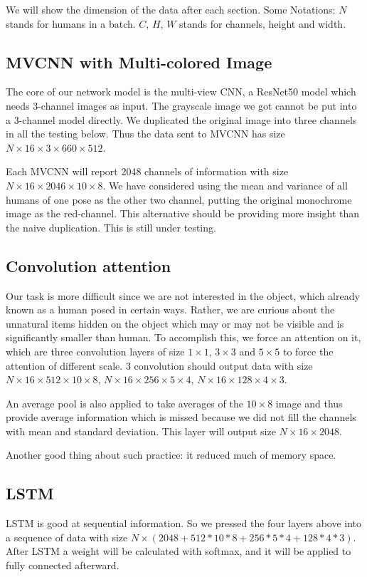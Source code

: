 \documentclass[conference,compsoc]{IEEEtran}
\begin{document}
We will show the dimension of the data after each section. Some Notations: $N$ stands for humans in a batch. $C$, $H$, $W$ stands for channels, height and width.

\subsection{MVCNN with Multi-colored Image}
The core of our network model is the multi-view CNN, a ResNet50 model which needs 3-channel images as input.
The grayscale image we got cannot be put into a 3-channel model directly. We duplicated the original image into three channels in all the testing below.
Thus the data sent to MVCNN has size $N\times16\times 3\times 660 \times 512$.

Each MVCNN will report 2048 channels of information with size $N \times 16 \times 2046 \times 10 \times 8$.
We have considered using the mean and variance of all humans of one pose as the other two channel, putting the original monochrome image as the red-channel. This alternative should be providing more insight than the naive duplication. This is still under testing.

\subsection{Convolution attention}
Our task is more difficult since we are not interested in the object, which already known as a human posed in certain ways. Rather, we are curious about the unnatural items hidden on the object which may or may not be visible and is significantly smaller than human. To accomplish this, we force an attention on it, which are three convolution layers of size $1\times1$, $3\times3$ and $5\times5$ to force the attention of different scale. 3 convolution should output data with size $N\times16\times512\times 10\times8$, $N\times16\times256\times5\times4$, $N\times16\times128\times4\times3$.

An average pool is also applied to take averages of the $10\times8$ image and thus provide average information which is missed because we did not fill the channels with mean and standard deviation. This layer will output size $N\times 16\times 2048$.

Another good thing about such practice: it reduced much of memory space.

\subsection{LSTM}
LSTM is good at sequential information. So we pressed the four layers above into a sequence of data with size $N\times(2048+512*10*8+256*5*4+128*4*3)$. After LSTM a weight will be calculated with softmax, and it will be applied to fully connected afterward.
\end{document}
